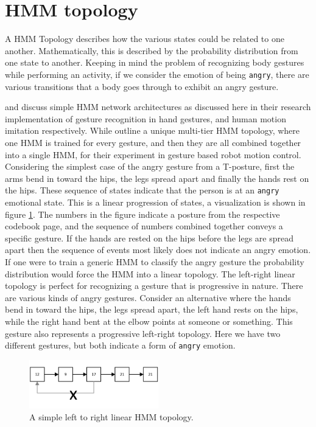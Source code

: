 \documentclass[]{report}   %
\begin{document}
\section{HMM topology}
A HMM Topology describes how the various states could be related to one another. Mathematically, this is described by the probability distribution from one state to another. Keeping in mind the problem of recognizing body gestures while performing an activity, if we consider the emotion of being \texttt{angry}, there are various transitions that a body goes through to exhibit an angry gesture.

\citet{Yang_1994_329} and \citet{4755984} discuss simple HMM network architectures as discussed here in their research implementation of gesture recognition in hand gestures, and human motion imitation respectively. While \citet{springerlink:10.1007/11492429_73} outline a unique multi-tier HMM topology, where one HMM is trained for every gesture, and then they are all combined together into a single HMM, for their experiment in gesture based robot motion control. Considering the simplest case of the angry gesture from a T-posture, first the arms bend in toward the hips, the legs spread apart and finally the hands rest on the hips. These sequence of states indicate that the person is at an \texttt{angry} emotional state. This is a linear progression of states, a visualization is shown in figure \ref{fig:lineartopology}. The numbers in the figure indicate a posture from the respective codebook page, and the sequence of numbers combined together conveys a specific gesture. If the hands are rested on the hips before the legs are spread apart then the sequence of events most likely does not indicate an angry emotion. If one were to train a generic HMM to classify the angry gesture the probability distribution would force the HMM into a linear topology. The left-right linear topology is perfect for recognizing a gesture that is progressive in nature. There are various kinds of angry gestures. Consider an alternative where the hands bend in toward the hips, the legs spread apart, the left hand rests on the hips, while the right hand bent at the elbow points at someone or something. This gesture also represents a progressive left-right topology. Here we have two different gestures, but both indicate a form of \texttt{angry} emotion. 

\begin{figure}[htbp]
	\centering
		\includegraphics[width=0.5\textwidth]{lineartopology.pdf}
	\caption{A simple left to right linear HMM topology.}
	\label{fig:lineartopology}
\end{figure}
\end{document}
